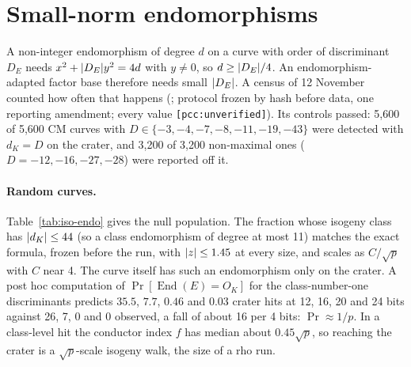 \section{Small-norm endomorphisms}\label{sec:iso-endo}

A non-integer endomorphism of degree $d$ on a curve with order of
discriminant $D_E$ needs $x^2+\lvert D_E \rvert y^2=4d$ with $y\ne0$, so $d\ge\lvert D_E \rvert/4$.
An endomorphism-adapted factor base therefore needs small $\lvert D_E \rvert$. A
census of 12 November counted how often that happens
(; protocol frozen by
hash before data, one reporting amendment; every value
\texttt{[pcc:unverified]}). Its controls passed: 5{,}600 of 5{,}600 CM curves
with $D\in\{-3,-4,-7,-8,-11,-19,-43\}$ were detected with $d_K=D$ on the
crater, and 3{,}200 of 3{,}200 non-maximal ones ($D=-12,-16,-27,-28$) were
reported off it.

\paragraph{Random curves.} Table~\ref{tab:iso-endo} gives the null
population. The fraction whose isogeny class has $\lvert d_K \rvert\le44$ (so a
class endomorphism of degree at most 11) matches the exact formula, frozen
before the run, with $\lvert z \rvert\le1.45$ at every size, and scales as $C/\sqrt p$
with $C$ near 4. The curve itself has such an endomorphism only on the
crater. A post hoc computation of $\Pr[\operatorname{End}(E)=O_K]$ for the
class-number-one discriminants predicts $35.5$, $7.7$, $0.46$ and $0.03$
crater hits at 12, 16, 20 and 24 bits against 26, 7, 0 and 0 observed, a
fall of about 16 per 4 bits: $\Pr\approx1/p$. In a class-level hit the
conductor index $f$ has median about $0.45\sqrt p$, so reaching the crater
is a $\sqrt p$-scale isogeny walk, the size of a rho run.

